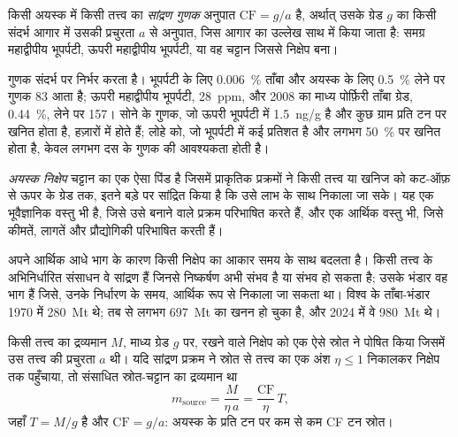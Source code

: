 \begin{definition}[सांद्रण गुणक]\label{def:b2:ore-deposits:cf}
किसी अयस्क में किसी तत्त्व का \emph{सांद्रण गुणक} अनुपात $\mathrm{CF} = g/a$ है, अर्थात्
उसके ग्रेड $g$ का किसी संदर्भ आगार में उसकी प्रचुरता $a$ से अनुपात, जिस आगार का उल्लेख साथ में किया जाता है:
समग्र महाद्वीपीय भूपर्पटी, ऊपरी महाद्वीपीय भूपर्पटी, या वह चट्टान जिससे निक्षेप बना।
\end{definition}

गुणक संदर्भ पर निर्भर करता है। भूपर्पटी के लिए \qty{0.006}{\percent} ताँबा और अयस्क के लिए
\qty{0.5}{\percent} लेने पर गुणक 83 आता है; ऊपरी महाद्वीपीय भूपर्पटी, \qty{28}{ppm}, और 2008 का
माध्य पोर्फ़िरी ताँबा ग्रेड, \qty{0.44}{\percent}, लेने पर 157। सोने के गुणक, जो ऊपरी भूपर्पटी में
\qty{1.5}{ng/g} है और कुछ ग्राम प्रति टन पर खनित होता है, हज़ारों में होते हैं; लोहे को, जो भूपर्पटी में
कई प्रतिशत है और लगभग \qty{50}{\percent} पर खनित होता है, केवल लगभग दस के गुणक की
आवश्यकता होती है।

\begin{definition}[अयस्क निक्षेप]\label{def:b2:ore-deposits:deposit}
\emph{अयस्क निक्षेप} चट्टान का एक ऐसा पिंड है जिसमें प्राकृतिक प्रक्रमों ने किसी तत्त्व या
खनिज को कट-ऑफ़ से ऊपर के ग्रेड तक, इतने बड़े  पर सांद्रित किया है कि उसे लाभ के साथ निकाला जा
सके। यह एक भूवैज्ञानिक वस्तु भी है, जिसे उसे बनाने वाले प्रक्रम परिभाषित करते हैं, और एक आर्थिक वस्तु भी,
जिसे कीमतें, लागतें और प्रौद्योगिकी परिभाषित करती हैं।
\end{definition}

अपने आर्थिक आधे भाग के कारण किसी निक्षेप का आकार समय के साथ बदलता है। किसी तत्त्व के अभिनिर्धारित
संसाधन वे सांद्रण हैं जिनसे निष्कर्षण अभी संभव है या संभव हो सकता है; उसके भंडार वह भाग हैं जिसे,
उनके निर्धारण के समय, आर्थिक रूप से निकाला जा सकता था। विश्व के ताँबा-भंडार 1970 में \qty{280}{Mt}
थे; तब से लगभग \qty{697}{Mt} का खनन हो चुका है, और 2024 में वे
\qty{980}{Mt} थे।

\begin{proposition}[किसी निक्षेप का द्रव्यमान-संतुलन]\label{prop:b2:ore-deposits:mass-balance}
किसी तत्त्व का द्रव्यमान $M$, माध्य ग्रेड $g$ पर, रखने वाले निक्षेप को एक ऐसे स्रोत ने पोषित किया जिसमें
उस तत्त्व की प्रचुरता $a$ थी। यदि सांद्रण प्रक्रम ने स्रोत से तत्त्व का एक अंश $\eta \leq 1$ निकालकर
निक्षेप तक पहुँचाया, तो संसाधित स्रोत-चट्टान का द्रव्यमान था
\begin{equation}
m_{\mathrm{source}} = \frac{M}{\eta\,a} = \frac{\mathrm{CF}}{\eta}\, T ,
\label{eq:b2:ore-deposits:mass-balance}
\end{equation}
जहाँ $T = M/g$  है और $\mathrm{CF} = g/a$: अयस्क के प्रति टन पर कम से कम CF टन स्रोत।
\end{proposition}

